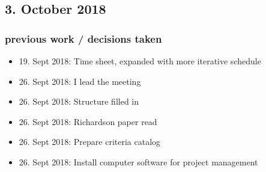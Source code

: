 \documentclass{article}
\begin{document}
        
    
\subsection{3. October 2018}

\subsubsection{previous work / decisions taken}
\begin{itemize}
    \item 19. Sept 2018: Time sheet, expanded with more iterative schedule
    \item 26. Sept 2018: I lead the meeting
    \item 26. Sept 2018: Structure filled in
    \item 26. Sept 2018: Richardson paper read
    \item 26. Sept 2018: Prepare criteria catalog
    \item 26. Sept 2018: Install computer software for project management
\end{itemize}
\end{document}

